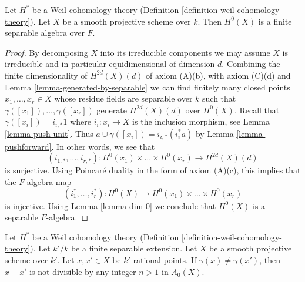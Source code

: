 \begin{lemma}
\label{lemma-H-0-separable}
Let $H^*$ be a Weil cohomology theory
(Definition \ref{definition-weil-cohomology-theory}).
Let $X$ be a smooth projective scheme over $k$. Then
$H^0(X)$ is a finite separable algebra over $F$.
\end{lemma}

\begin{proof}
By decomposing $X$ into its irreducible components we may
assume $X$ is irreducible and in particular equidimensional
of dimension $d$. Combining the finite dimensionality of
$H^{2d}(X)(d)$ of axiom (A)(b), with axiom (C)(d) and
Lemma \ref{lemma-generated-by-separable}
we can find finitely many closed points
$x_1, \ldots, x_r \in X$ whose residue fields are
separable over $k$ such that $\gamma([x_1]), \ldots, \gamma([x_r])$
generate $H^{2d}(X)(d)$ over $H^0(X)$.
Recall that $\gamma([x_i]) = i_{i, *}1$ where
$i_i : x_i \to X$ is the inclusion morphism, see
Lemma \ref{lemma-push-unit}. Thus $a \cup \gamma([x_i]) = i_{i, *}(i_i^*a)$ by
Lemma \ref{lemma-pushforward}. In other words, we see that
$$
(i_{1, *}, \ldots, i_{r, *}) :
H^0(x_1) \times \ldots \times H^0(x_r)
\longrightarrow
H^{2d}(X)(d)
$$
is surjective. Using Poincar\'e duality in the form of axiom (A)(c),
this implies that the $F$-algebra map
$$
(i_1^*, \ldots, i_r^*) :
H^0(X)
\longrightarrow
H^0(x_1) \times \ldots \times H^0(x_r)
$$
is injective. Using Lemma \ref{lemma-dim-0} we conclude that
$H^0(X)$ is a separable $F$-algebra.
\end{proof}

\begin{lemma}
\label{lemma-relations-classes-points}
Let $H^*$ be a Weil cohomology theory
(Definition \ref{definition-weil-cohomology-theory}).
Let $k'/k$ be a finite separable extension.
Let $X$ be a smooth projective scheme over $k'$.
Let $x, x' \in X$ be $k'$-rational points.
If $\gamma(x) \not = \gamma(x')$, then
$x - x'$ is not divisible by any integer $n > 1$ in $A_0(X)$.
\end{lemma}


